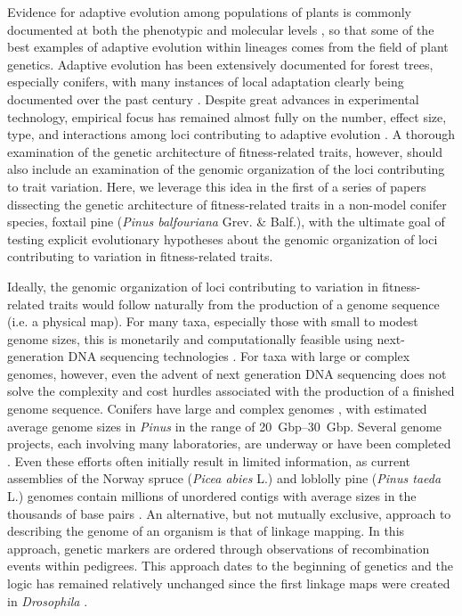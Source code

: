 \documentclass[11pt]{article}
\begin{document}
Evidence for adaptive evolution among populations of plants is commonly documented at both the phenotypic 
and molecular levels \citep{Kawecki:2004, Pannell:2013}, so that some of the best
examples of adaptive evolution within lineages comes from the field of plant genetics.
Adaptive evolution has been extensively documented for forest trees, especially conifers, with many instances of local adaptation clearly
being documented over the past century \citep{White:2007, Neale:2011}. Despite great advances in experimental technology, empirical 
focus has remained almost fully on the number, effect size, type, and interactions among loci contributing 
to adaptive evolution \citep{Neale:2011, Alberto:2013}.  A thorough examination of the 
genetic architecture of fitness-related traits, however, should also include 
an examination of the genomic organization of the loci contributing to trait variation. Here, we leverage 
this idea in the first of a series of papers dissecting the genetic architecture of fitness-related 
traits in a non-model conifer species, foxtail pine (\textit{Pinus balfouriana} Grev. \& Balf.), with the 
ultimate goal of testing explicit evolutionary hypotheses about the genomic organization of loci 
contributing to variation in fitness-related traits.

Ideally, the genomic organization of loci contributing to variation in fitness-related traits would follow 
naturally from the production of a genome sequence (i.e. a physical map). For many taxa, especially those with 
small to modest genome sizes, this is monetarily and computationally feasible using next-generation DNA sequencing 
technologies \citep{Koboldt:2013}. For taxa with large or complex genomes, however, even the advent of next generation DNA 
sequencing does not solve the complexity and cost hurdles associated with the production of a finished genome sequence. Conifers have large and 
complex genomes \citep{Murray:1998, Ahuja:2005}, with estimated average genome sizes in \textit{Pinus} in the 
range of \SIrange{20}{30}{Gbp}. Several genome projects, each involving many laboratories, are underway or have been 
completed \citep{Mackay:2012}. Even these efforts often initially result in limited information, 
as current assemblies of the Norway spruce (\textit{Picea abies} L.) and loblolly pine (\textit{Pinus taeda} L.) genomes 
contain millions of unordered contigs with average sizes in the thousands of base pairs \citep{Nystedt:2013}. An alternative, but not mutually exclusive, approach to describing the genome of an organism 
is that of linkage mapping. In this approach, genetic markers are ordered through observations of recombination events 
within pedigrees. This approach dates to the beginning of genetics and the logic has remained relatively unchanged 
since the first linkage maps were created in \textit{Drosophila} \citep{Sturtevant:1913}.
\end{document}
